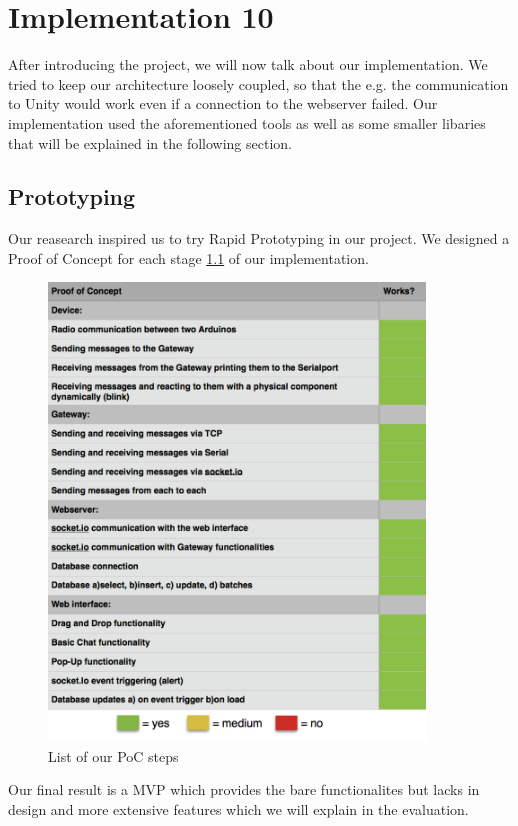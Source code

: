 
\chapter{Implementation 10} %

\label{Chapter3} %

After introducing the project, we will now talk about our implementation.
We tried to keep our architecture loosely coupled, so that the e.g. the communication to Unity would work even if a connection to the webserver failed.
Our implementation used the aforementioned tools as well as some smaller libaries that will be explained in the following section.
\section{Prototyping}
Our reasearch inspired us to try Rapid Prototyping in our project. 
We designed a Proof of Concept for each stage \ref{fig:PoC} of our implementation.
\begin{figure}[th]
	\centering
	\includegraphics[width=100mm,scale=1]{Figures/PoC}
	\decoRule
	\caption[PoC]{List of our PoC steps}
	\label{fig:PoC}
\end{figure}
Our final result is a MVP %
which provides the bare functionalites but lacks in design and more extensive features which we will explain in the evaluation.
